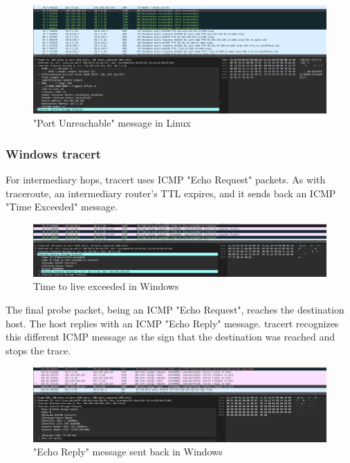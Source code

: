 \documentclass{article}
\begin{document}
\begin{figure}[H]
    \centering
    \includegraphics[width=1\linewidth]{linux final traceroute.png}
    \caption{"Port Unreachable" message in Linux}
    \label{fig:placeholder}
\end{figure}

\subsubsection{Windows tracert}
For intermediary hops, tracert uses ICMP "Echo Request" packets. As with traceroute, an intermediary router's TTL expires, and it sends back an ICMP "Time Exceeded" message.

\begin{figure}[H]
    \centering
    \includegraphics[width=1\linewidth]{ttl exceeded windows.png}
    \caption{Time to live exceeded in Windows}
    \label{fig:placeholder}
\end{figure}

The final probe packet, being an ICMP "Echo Request", reaches the destination host. The host replies with an ICMP "Echo Reply" message. tracert recognizes this different ICMP message as the sign that the destination was reached and stops the trace.


\begin{figure}[H]
    \centering
    \includegraphics[width=1\linewidth]{ICMP reply windows.png}
    \caption{"Echo Reply" message sent back in Windows}
    \label{fig:placeholder}
\end{figure}
\end{document}
